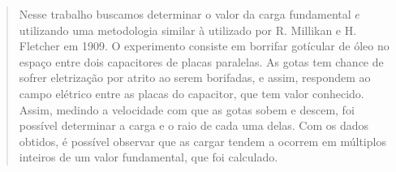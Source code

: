\begin{abstract}

Nesse trabalho buscamos determinar o valor da carga fundamental $e$ 
utilizando uma metodologia similar à utilizado por R. Millikan e H. Fletcher
em 1909.
O experimento consiste em borrifar gotícular de óleo no espaço entre dois capacitores
de placas paralelas. 
As gotas tem chance de sofrer eletrização por atrito ao serem borifadas, e assim, 
respondem ao campo elétrico entre as placas do capacitor, que tem valor conhecido. 
Assim, medindo a velocidade com que as gotas sobem e descem, foi possível 
determinar a carga e o raio de cada uma delas. 
Com os dados obtidos, é possível observar que as cargar tendem a ocorrem em 
múltiplos inteiros de um valor fundamental, que foi calculado. 

\end{abstract}
